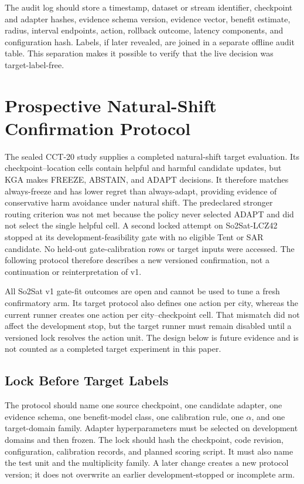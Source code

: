 The audit log should store a timestamp, dataset or stream identifier, checkpoint and adapter hashes,
evidence schema version, evidence vector, benefit estimate, radius, interval endpoints, action,
rollback outcome, latency components, and configuration hash. Labels, if later revealed, are joined
in a separate offline audit table. This separation makes it possible to verify that the live
decision was target-label-free.

\section{Prospective Natural-Shift Confirmation Protocol}
\label{app:compact-confirmation}

The sealed CCT-20 study supplies a completed natural-shift target evaluation. Its
\CCTCellCount{} checkpoint--location cells contain \CCTHelpfulCount{} helpful and
\CCTHarmfulCount{} harmful candidate updates, but KGA makes \CCTFreezeCount{} FREEZE,
\CCTAbstainCount{} ABSTAIN, and \CCTAdaptCount{} ADAPT decisions. It therefore matches
always-freeze and has lower regret than always-adapt, providing evidence of conservative harm
avoidance under natural shift. The predeclared stronger routing criterion was not met because the
policy never selected ADAPT and did not select the single helpful cell. A second
locked attempt on So2Sat-LCZ42 stopped at its development-feasibility gate with no eligible Tent or
SAR candidate. No held-out gate-calibration rows or target inputs were accessed. The following
protocol therefore describes a new versioned confirmation, not a continuation or reinterpretation
of v1.

All So2Sat v1 gate-fit outcomes are open and cannot be used to tune a fresh confirmatory arm. Its
target protocol also defines one action per city, whereas the current runner creates one action per
city--checkpoint cell. That mismatch did not affect the development stop, but the target runner
must remain disabled until a versioned lock resolves the action unit. The design below is future
evidence and is not counted as a completed target experiment in this paper.

\subsection{Lock Before Target Labels}

The protocol should name one source checkpoint, one candidate adapter, one evidence schema, one
benefit-model class, one calibration rule, one $\alpha$, and one target-domain family. Adapter
hyperparameters must be selected on development domains and then frozen. The lock should hash the
checkpoint, code revision, configuration, calibration records, and planned scoring script. It must
also name the test unit and the multiplicity family. A later change creates a new protocol version;
it does not overwrite an earlier development-stopped or incomplete arm.

